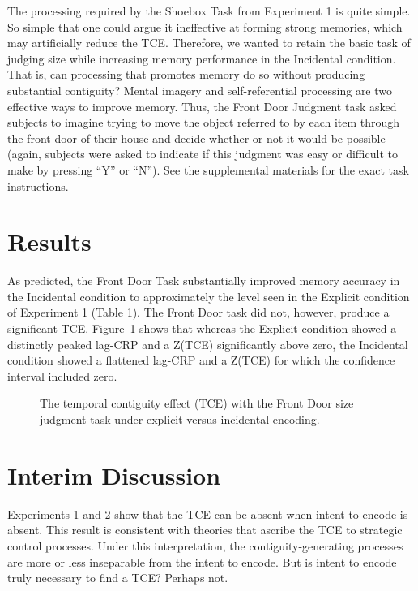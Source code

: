 \documentclass[man,natbib,floatsintext]{apa6} %
\begin{document}
The processing required by the Shoebox Task from Experiment 1 is quite simple. So simple that one could argue it ineffective at forming strong memories, which may artificially reduce the TCE. Therefore, we wanted to retain the basic task of judging size while increasing memory performance in the Incidental condition. That is, can processing that promotes memory do so without producing substantial contiguity? Mental imagery and self-referential processing are two effective ways to improve memory. Thus, the Front Door Judgment task asked subjects to imagine trying to move the object referred to by each item through the front door of their house and decide whether or not it would be possible (again, subjects were asked to indicate if this judgment was easy or difficult to make by pressing ``Y'' or ``N'').
See the supplemental materials for the exact task instructions.

\section{Results}
As predicted, the Front Door Task substantially improved memory accuracy in the Incidental condition to approximately the level seen in the Explicit condition of Experiment 1 (Table 1). The Front Door task did not, however, produce a significant TCE. Figure~\ref{door} shows that whereas the Explicit condition showed a distinctly peaked lag-CRP and a Z(TCE) significantly above zero, the Incidental condition showed a flattened lag-CRP and a Z(TCE) for which the confidence interval included zero.

\begin{figure}%
\caption{The temporal contiguity effect (TCE) with the Front Door size judgment task under explicit versus incidental encoding. \paneltext}
\label{door}
\end{figure}

\section{Interim Discussion}
Experiments 1 and 2 show that the TCE can be absent when intent to encode is absent. This result is consistent with theories that ascribe the TCE to strategic control processes. Under this interpretation, the contiguity-generating processes are more or less inseparable from the intent to encode. But is intent to encode truly necessary to find a TCE? Perhaps not.
\end{document}
